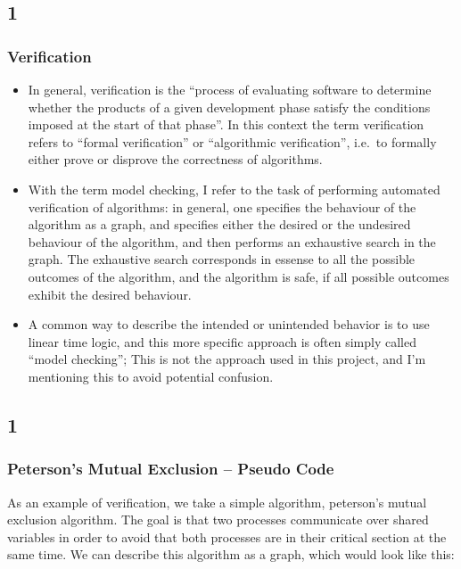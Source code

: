 \documentclass[handout]{beamer}
\begin{document}
\begin{footnotesize}
\subsection*{1}
\begin{frame}
  \frametitle{Verification}
  \begin{itemize}
  \item
  In general, verification is the ``process of evaluating software to determine whether the products of a given development phase satisfy the conditions imposed at the start of that phase''. In this context the term verification refers to ``formal verification'' or ``algorithmic verification'', i.e.\ to formally either prove or disprove the correctness of algorithms.
  \item
  With the term model checking, I refer to the task of performing automated verification of algorithms: in general, one specifies the behaviour of the algorithm as a graph, and specifies either the desired or the undesired behaviour of the algorithm, and then performs an exhaustive search in the graph. The exhaustive search corresponds in essense to all the possible outcomes of the algorithm, and the algorithm is safe, if all possible outcomes exhibit the desired behaviour.
  \item
  A common way to describe the intended or unintended behavior is to use linear time logic, and this more specific approach is often simply called ``model checking''; This is not the approach used in this project, and I'm mentioning this to avoid potential confusion.
  \end{itemize}
\end{frame}

\subsection*{1}
\begin{frame}
  \frametitle{Peterson's Mutual Exclusion -- Pseudo Code}
As an example of verification, we take a simple algorithm, peterson's mutual exclusion algorithm. The goal is that two processes communicate over shared variables in order to avoid that both processes are in their critical section at the same time. We can describe this algorithm as a graph, which would look like this:
\end{frame}


\end{footnotesize}
\end{document}

